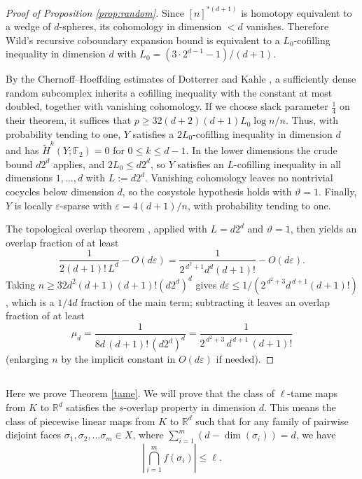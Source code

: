 \documentclass[12pt,a4paper,oneside]{amsart}\sloppy
\theoremstyle{definition}
\begin{document}
\begin{proof}[Proof of Proposition \ref{prop:random}]
Since $[n]^{*(d+1)}$ is homotopy equivalent to a wedge of $d$-spheres, its cohomology in dimension $<d$ vanishes. Therefore Wild's recursive coboundary expansion bound
\cite[Proposition~8.6]{wild_thesis} is equivalent to a
$L_0$-cofilling inequality in dimension $d$ with $L_0=(3\cdot 2^{d-1}-1)/(d+1)$.

By the Chernoff--Hoeffding estimates of Dotterrer and Kahle \cite{dotterer_kahle},
a sufficiently dense random subcomplex inherits a cofilling inequality with the
constant at most doubled, together with vanishing cohomology. If we choose slack parameter
$\tfrac14$ on their theorem, it suffices that $p\ge 32(d+2)(d+1)L_0\log n/n$. Thus, with probability
tending to one, $Y$ satisfies a $2L_0$-cofilling inequality in dimension $d$ and has
$\widetilde H^{k}(Y;\mathbb F_2)=0$ for $0\le k\le d-1$. In the lower dimensions the
crude bound $d2^{d}$ applies, and $2L_0\le d2^{d}$, so $Y$ satisfies an $L$-cofilling
inequality in all dimensions $1,\dots,d$ with $L:=d2^{d}$. Vanishing cohomology
leaves no nontrivial cocycles below dimension $d$, so the cosystole hypothesis holds
with $\vartheta=1$. Finally, $Y$ is locally $\varepsilon$-sparse with
$\varepsilon=4(d+1)/n$, with probability tending to one.

The topological overlap theorem \cite[Theorem 8]{dotterer_kaufman_wagner}, applied with
$L=d2^{d}$ and $\vartheta=1$, then yields an overlap fraction of at least
\[
   \frac{1}{2(d+1)!\,L^{d}}-O(d\varepsilon)
   =\frac{1}{2^{\,d^{2}+1}d^{d}(d+1)!}-O(d\varepsilon).
\]
Taking $n\ge 32d^{2}(d+1)(d+1)!(d2^{d})^{d}$ gives
$d\varepsilon\le 1/(2^{\,d^{2}+3}d^{\,d+1}(d+1)!)$, which is a $1/4d$ fraction of the
main term; subtracting it leaves an overlap fraction of at least
\[
   \mu_d=\frac{1}{8d\,(d+1)!\,(d2^{d})^{d}}
        =\frac{1}{2^{\,d^{2}+3}\,d^{\,d+1}\,(d+1)!}
\]
(enlarging $n$ by the implicit constant in $O(d\varepsilon)$ if needed). 
\end{proof}

\subsection{} Here we prove Theorem \ref{tame}. We will prove that the class of $\ell$-tame maps from $K$ to $\mathbb{R}^d$ satisfies the $s$-overlap property in dimension $d$. This means the class of piecewise linear maps from $K$ to $\mathbb{R}^d$ such that for any family of pairwise disjoint faces $\sigma_1,\sigma_2, \ldots \sigma_m\in X$, where $\sum_{i=1}^m (d- \dim(\sigma_i))=d$, we have 
\[\left| \bigcap_{i=1}^m f(\sigma_i) \right|\le \ell.\]
\end{document}
